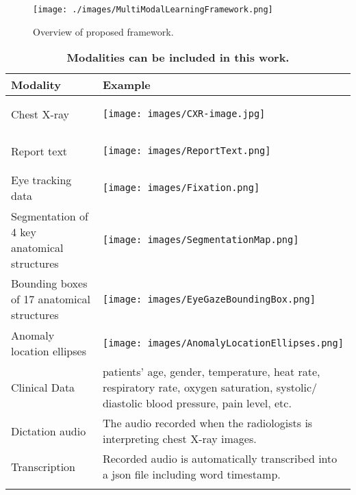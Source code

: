 \begin{figure}[!h]
    \centering
    \texttt{[image: ./images/MultiModalLearningFramework.png]}
    \caption{Overview of proposed framework.}
    \label{fig: proposed_framework}
\end{figure}

\begin{longtable}{|m{10em}|m{30em}|}
    \hline
    Modality                                    & Example                                                                                            \\ \hline
    Chest X-ray                                 & \begin{center}\texttt{[image: images/CXR-image.jpg]}\end{center}               \\ \hline
    Report text                                 & \begin{center}\texttt{[image: images/ReportText.png]}\end{center}              \\ \hline
    Eye tracking data                           & \begin{center}\texttt{[image: images/Fixation.png]}\end{center}
    \\ \hline
    Segmentation of 4 key anatomical structures & \begin{center}\texttt{[image: images/SegmentationMap.png]}\end{center}
    \\ \hline
    Bounding boxes of 17 anatomical structures  & \begin{center}\texttt{[image: images/EyeGazeBoundingBox.png]}\end{center}
    \\ \hline
    Anomaly location ellipses                   & \begin{center}\texttt{[image: images/AnomalyLocationEllipses.png]}\end{center}
    \\ \hline
    Clinical Data                               &
    patients' age, gender, temperature, heat rate, respiratory rate, oxygen saturation, systolic/ diastolic blood pressure, pain level, etc.         \\ \hline
    Dictation audio                             & The audio recorded when the radiologists is interpreting chest X-ray images.
    \\ \hline
    Transcription                               & Recorded audio is automatically transcribed into a json file including word timestamp.             \\ \hline
    \caption{\textbf{Modalities can be included in this work.}} %
    \label{tab:modalities_table}
\end{longtable}




